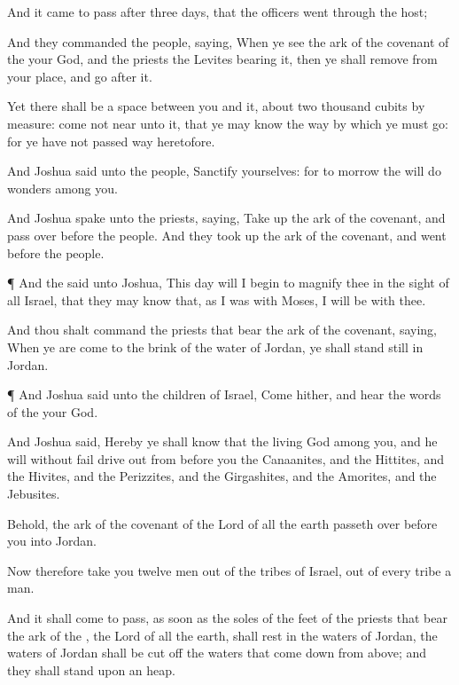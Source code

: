 {And it came to pass
after
three
days, that the
officers
went
through the
host;

And they
commanded the
people,
saying, When ye
see the
ark of the
covenant of the
{} your
God, and the
priests the
Levites
bearing it, then ye shall
remove from your
place, and
go
after it.

Yet there shall be a
space between you and it, about two
thousand
cubits by
measure: come not
near unto it, that ye may
know the
way by which ye must
go: for ye have not
passed
{}
way
heretofore.

And
Joshua
said unto the
people,
Sanctify yourselves: for to
morrow the
{} will
do
wonders
among you.

And
Joshua
spake unto the
priests,
saying, Take
up the
ark of the
covenant, and pass
over
before the
people. And they took
up the
ark of the
covenant, and
went
before the
people.


\par }{\PP {}¶ And the
{}
said unto
Joshua, This
day will I
begin to
magnify thee in the
sight of all
Israel, that they may
know that, as I was with
Moses,
{} I will be with thee.

And thou shalt
command the
priests that
bear the
ark of the
covenant,
saying, When ye are
come to the
brink of the
water of
Jordan, ye shall stand
still in
Jordan.


\par }{\PP {}¶ And
Joshua
said unto the
children of
Israel, Come
hither, and
hear the
words of the
{} your
God.

And
Joshua
said, Hereby ye shall
know that the
living
God
{}
among you, and
{} he will without
fail drive
out from
before you the
Canaanites, and the
Hittites, and the
Hivites, and the
Perizzites, and the
Girgashites, and the
Amorites, and the
Jebusites.

Behold, the
ark of the
covenant of the
Lord of all the
earth passeth
over
before you into
Jordan.

Now therefore
take you
twelve
men out of the
tribes of
Israel, out of
every
tribe a
man.

And it shall come to pass, as soon as the
soles of the
feet of the
priests that
bear the
ark of the
{}, the
Lord of all the
earth, shall
rest in the
waters of
Jordan,
{} the
waters of
Jordan shall be cut
off
{} the
waters that come
down from
above; and they shall
stand upon
an
heap.


}
